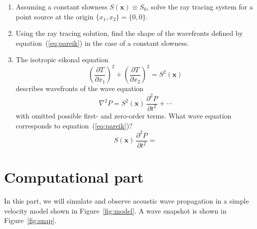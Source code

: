 \begin{enumerate}
\begin{enumerate}
   \item Assuming a constant slowness $S(\mathbf{x}) \equiv S_0$, solve
    the ray tracing system for a point source at the origin
    $\{x_1,x_2\} = \{0,0\}$.

   \item Using the ray tracing solution, find the shape of the
    wavefronts defined by equation~(\ref{eq:pareik}) in the case of a
    constant slowness.

   \item The isotropic eikonal equation
    \begin{equation}
      \label{eq:iso}
      \left(\frac{\partial T}{\partial x_1}\right)^2 +
      \left(\frac{\partial T}{\partial x_2}\right)^2 = S^2(\mathbf{x})
    \end{equation}
    describes wavefronts of the wave equation
    \begin{equation}
      \label{eq:isowave}
      \nabla^2 P  = S^2(\mathbf{x})\,\frac{\partial^2 P}{\partial t^2} 
      + \cdots
    \end{equation}
    with omitted possible first- and zero-order terms. 
    What wave equation corresponds to equation~(\ref{eq:pareik})?
    \begin{equation}
      S(\mathbf{x})\,{\frac{\partial^2 P}{\partial t^2}} =
      \label{eq:parwave}
    \end{equation}

  \end{enumerate}
\end{enumerate}

\section{Computational part}

In this part, we will simulate and observe acoustic wave propagation
in a simple velocity model shown in Figure~\ref{fig:model}. A wave
snapshot is shown in Figure~\ref{fig:snap}.


